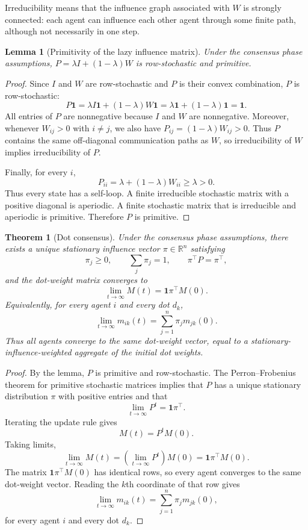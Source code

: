 \documentclass[11pt]{article}
\newtheorem{theorem}{Theorem}
\newtheorem{lemma}{Lemma}
\theoremstyle{remark}
\begin{document}
Irreducibility means that the influence graph associated with $W$ is
strongly connected: each agent can influence each other agent through
some finite path, although not necessarily in one step.

\begin{lemma}[Primitivity of the lazy influence matrix]
Under the consensus phase assumptions, $P=\lambda I+(1-\lambda)W$ is
row-stochastic and primitive.
\end{lemma}

\begin{proof}
Since $I$ and $W$ are row-stochastic and $P$ is their convex
combination, $P$ is row-stochastic:
$$
P\mathbf{1}=\lambda I\mathbf{1}+(1-\lambda)W\mathbf{1}
=\lambda\mathbf{1}+(1-\lambda)\mathbf{1}=\mathbf{1}.
$$
All entries of $P$ are nonnegative because $I$ and $W$ are nonnegative.
Moreover, whenever $W_{ij}>0$ with $i\neq j$, we also have
$P_{ij}=(1-\lambda)W_{ij}>0$. Thus $P$ contains the same off-diagonal
communication paths as $W$, so irreducibility of $W$ implies
irreducibility of $P$.

Finally, for every $i$,
$$
P_{ii}=\lambda+(1-\lambda)W_{ii}\geq \lambda>0.
$$
Thus every state has a self-loop. A finite irreducible stochastic matrix
with a positive diagonal is aperiodic. A finite stochastic matrix that is
irreducible and aperiodic is primitive. Therefore $P$ is primitive.
\end{proof}

\begin{theorem}[Dot consensus]\label{thm:dot-consensus}
Under the consensus phase assumptions, there exists a unique stationary
influence vector $\pi\in\mathbb{R}^n$ satisfying
$$
\pi_j\geq 0,\qquad \sum_j \pi_j=1,\qquad \pi^\top P=\pi^\top,
$$
and the dot-weight matrix converges to
$$
\lim_{t\to\infty}M(t)=\mathbf{1}\pi^\top M(0).
$$
Equivalently, for every agent $i$ and every dot $d_k$,
$$
\lim_{t\to\infty}m_{ik}(t)=\sum_{j=1}^n \pi_j m_{jk}(0).
$$
Thus all agents converge to the same dot-weight vector, equal to a
stationary-influence-weighted aggregate of the initial dot weights.
\end{theorem}

\begin{proof}
By the lemma, $P$ is primitive and row-stochastic. The
Perron--Frobenius theorem for primitive stochastic matrices implies that
$P$ has a unique stationary distribution $\pi$ with positive entries and
that
$$
\lim_{t\to\infty}P^t=\mathbf{1}\pi^\top.
$$
Iterating the update rule gives
$$
M(t)=P^tM(0).
$$
Taking limits,
$$
\lim_{t\to\infty}M(t)
=\left(\lim_{t\to\infty}P^t\right)M(0)
=\mathbf{1}\pi^\top M(0).
$$
The matrix $\mathbf{1}\pi^\top M(0)$ has identical rows, so every agent
converges to the same dot-weight vector. Reading the $k$th coordinate of
that row gives
$$
\lim_{t\to\infty}m_{ik}(t)=\sum_{j=1}^n \pi_jm_{jk}(0),
$$
for every agent $i$ and every dot $d_k$.
\end{proof}
\end{document}
